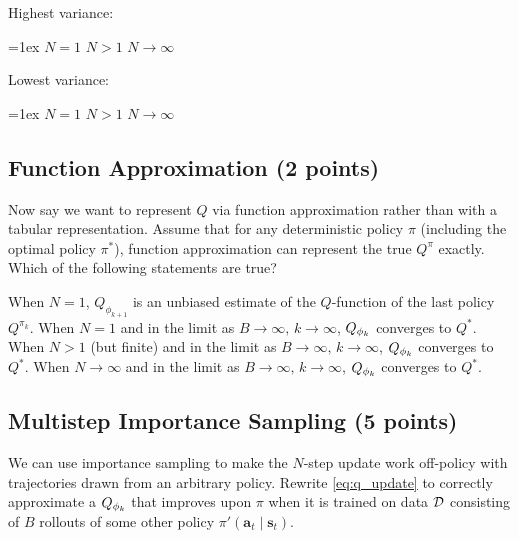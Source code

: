 \def\highest{} %
\def\lowest{} %
\ifsolutions\solve\thesubsection\fi
\begin{minipage}{0.49\linewidth}
Highest variance:\smallskip
\begin{itemize}\itemsep=1ex
    \checkeditem\highest1 $N = 1$
    \checkeditem\highest2 $N > 1$
    \checkeditem\highest3 $N \to \infty$
\end{itemize}
\end{minipage}
\begin{minipage}{0.49\linewidth}
Lowest variance:\smallskip
\begin{itemize}\itemsep=1ex
    \checkeditem\lowest1 $N = 1$
    \checkeditem\lowest2 $N > 1$
    \checkeditem\lowest3 $N \to \infty$
\end{itemize}
\end{minipage}

\subsection{Function Approximation (2 points)}
\label{q:function_approximation}
Now say we want to represent $Q$ via function approximation rather than with a tabular representation. Assume that for any deterministic policy $\pi$ (including the optimal policy $\pi^*$), function approximation can represent the true $Q^\pi$ exactly.
Which of the following statements are true?

\def\answer{} %
\ifsolutions\solve\thesubsection\fi
\begin{itemize}
    \checkeditem\answer1 When $N = 1$, $Q_{\phi_{k+1}}$ is an unbiased estimate of the $Q$-function of the last policy $Q^{\pi_k}$.
    \checkeditem\answer2 When $N = 1$ and in the limit as $B\to\infty,\,k \to \infty$, $Q_{\phi_k}$ converges to $Q^*$.
    \checkeditem\answer3 When $N > 1$ (but finite) and in the limit as $B\to\infty,\,k \to \infty$, $Q_{\phi_k}$ converges to $Q^*$.
    \checkeditem\answer4 When $N \to \infty$ and in the limit as $B \to \infty,\,k \to \infty$, $Q_{\phi_k}$ converges to $Q^*$.
\end{itemize}

\subsection{Multistep Importance Sampling (5 points)}
\label{q:importance_sampling}

We can use importance sampling to make the $N$-step update work off-policy with trajectories drawn from an arbitrary policy. Rewrite \eqref{eq:q_update} to correctly approximate a $Q_{\phi_k}$ that improves upon $\pi$ when it is trained on data $\mathcal{D}$ consisting of $B$ rollouts of some other policy $\pi'(\mathbf a_t\mid\mathbf s_t)$. 

